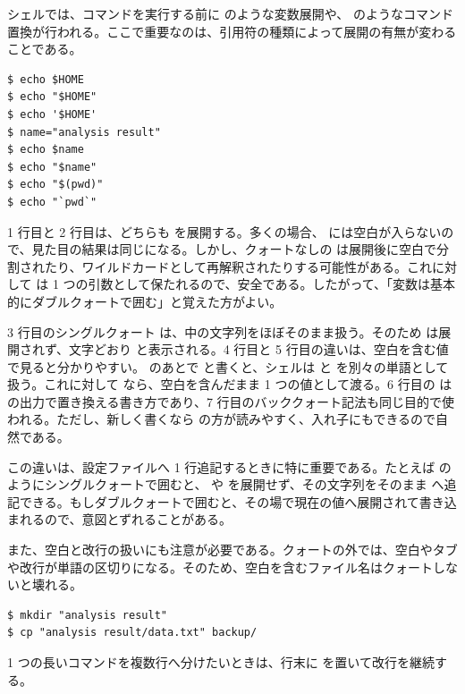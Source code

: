 シェルでは、コマンドを実行する前に  のような変数展開や、 のようなコマンド置換が行われる。ここで重要なのは、引用符の種類によって展開の有無が変わることである。

\begin{lstlisting}[numbers=none, xleftmargin=2\zw]
$ echo $HOME
$ echo "$HOME"
$ echo '$HOME'
$ name="analysis result"
$ echo $name
$ echo "$name"
$ echo "$(pwd)"
$ echo "`pwd`"
\end{lstlisting}

1 行目と 2 行目は、どちらも  を展開する。多くの場合、 には空白が入らないので、見た目の結果は同じになる。しかし、クォートなしの  は展開後に空白で分割されたり、ワイルドカードとして再解釈されたりする可能性がある。これに対して  は 1 つの引数として保たれるので、安全である。したがって、「変数は基本的にダブルクォートで囲む」と覚えた方がよい。

3 行目のシングルクォート  は、中の文字列をほぼそのまま扱う。そのため  は展開されず、文字どおり  と表示される。4 行目と 5 行目の違いは、空白を含む値で見ると分かりやすい。  のあとで  と書くと、シェルは  と  を別々の単語として扱う。これに対して  なら、空白を含んだまま 1 つの値として渡る。6 行目の  は  の出力で置き換える書き方であり、7 行目のバッククォート記法も同じ目的で使われる。ただし、新しく書くなら  の方が読みやすく、入れ子にもできるので自然である。

この違いは、設定ファイルへ 1 行追記するときに特に重要である。たとえば  のようにシングルクォートで囲むと、 や  を展開せず、その文字列をそのまま  へ追記できる。もしダブルクォートで囲むと、その場で現在の値へ展開されて書き込まれるので、意図とずれることがある。

また、空白と改行の扱いにも注意が必要である。クォートの外では、空白やタブや改行が単語の区切りになる。そのため、空白を含むファイル名はクォートしないと壊れる。

\begin{lstlisting}[numbers=none, xleftmargin=2\zw]
$ mkdir "analysis result"
$ cp "analysis result/data.txt" backup/
\end{lstlisting}

1 つの長いコマンドを複数行へ分けたいときは、行末に \code{\textbackslash} を置いて改行を継続する。

